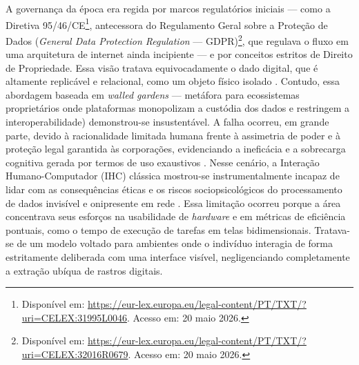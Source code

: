 \documentclass[12pt]{article}
\begin{document}
    A governança da época era regida por marcos regulatórios iniciais — como a Diretiva 95/46/CE\footnote{Disponível em: \url{https://eur-lex.europa.eu/legal-content/PT/TXT/?uri=CELEX:31995L0046}. Acesso em: 20 maio 2026.}, antecessora do Regulamento Geral sobre a Proteção de Dados (\textit{General Data Protection Regulation} — GDPR)\footnote{Disponível em: \url{https://eur-lex.europa.eu/legal-content/PT/TXT/?uri=CELEX:32016R0679}. Acesso em: 20 maio 2026.}, que regulava o fluxo em uma arquitetura de internet ainda incipiente — e por conceitos estritos de Direito de Propriedade. Essa visão tratava equivocadamente o dado digital, que é altamente replicável e relacional, como um objeto físico isolado \cite{malgieri2019automated, janecek2018ownership}. Contudo, essa abordagem baseada em \textit{walled gardens} — metáfora para ecossistemas proprietários onde plataformas monopolizam a custódia dos dados e restringem a interoperabilidade) demonstrou-se insustentável. A falha ocorreu, em grande parte, devido à racionalidade limitada humana frente à assimetria de poder e à proteção legal garantida às corporações, evidenciando a ineficácia e a sobrecarga cognitiva gerada por termos de uso exaustivos \cite{malgieri2020vulnerable, DOWTHWAITE2024, chalhoub2024useful}.
    Nesse cenário, a Interação Humano-Computador (IHC) clássica mostrou-se instrumentalmente incapaz de lidar com as consequências éticas e os riscos sociopsicológicos do processamento de dados invisível e onipresente em rede \cite{Parviainen2016}. Essa limitação ocorreu porque a área concentrava seus esforços na usabilidade de \textit{hardware} e em métricas de eficiência pontuais, como o tempo de execução de tarefas em telas bidimensionais. Tratava-se de um modelo voltado para ambientes onde o indivíduo interagia de forma estritamente deliberada com uma interface visível, negligenciando completamente a extração ubíqua de rastros digitais.
\end{document}
